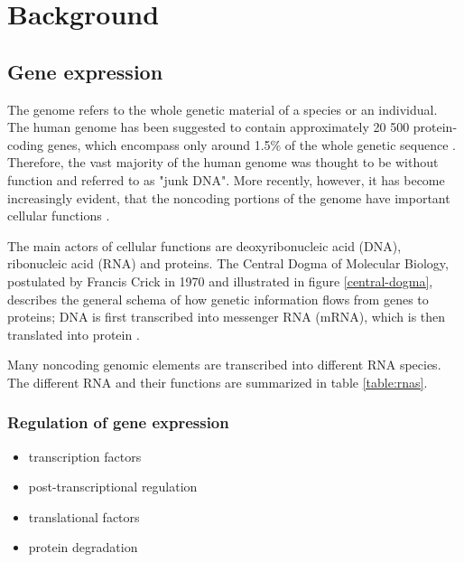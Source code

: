 


\section{Background}\label{background}











\subsection{Gene expression}\label{gene-expression}

The genome refers to the whole genetic material of a species or an individual.
The human genome has been suggested to contain approximately 20 500
protein-coding genes, which encompass only around 1.5\% of the whole genetic sequence
\citep{Clamp2007}. Therefore, the vast majority of the human genome was thought
to be without function and referred to as "junk DNA". More recently, however,
it has become increasingly evident, that the noncoding portions of the
genome have important cellular functions \citep{ENCODE?}.

The main actors of cellular functions are deoxyribonucleic acid (DNA),
ribonucleic acid (RNA) and proteins. The Central Dogma of
Molecular Biology, postulated by Francis Crick in 1970 and
illustrated in figure \ref{central-dogma}, describes the general schema of
how genetic information flows from genes to proteins; DNA is first
transcribed into messenger RNA (mRNA), which is then translated into protein
\citep{Crick1970}.

Many noncoding genomic elements are transcribed into
different RNA species. The different RNA and their functions are
summarized in table \ref{table:rnas}.




\subsubsection{Regulation of gene expression}\label{regulation-of-gene-expression}

\begin{itemize}
  \item transcription factors
  \item post-transcriptional regulation
  \item translational factors
  \item protein degradation
\end{itemize}



